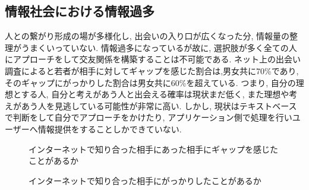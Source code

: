 \subsection{情報社会における情報過多}
人との繋がり形成の場が多様化し, 出会いの入り口が広くなった分, 情報量の整理がうまくいっていない.
情報過多になっているが故に, 選択肢が多く全ての人にアプローチをして交友関係を構築することは不可能である.
ネット上の出会い調査によると若者が相手に対してギャップを感じた割合は,男女共に70\%であり,
そのギャップにがっかりした割合は男女共に60\%を超えている.\cite{mandom}
つまり, 自分の理想とする人, 自分と考えがあう人と出会える確率は現状まだ低く, また理想や考えがあう人を見逃している可能性が非常に高い.
しかし, 現状はテキストベースで判断をして自分でアプローチをかけたり, アプリケーション側で処理を行いユーザーへ情報提供をすることしかできていない.
\begin{figure}[htbp]
    \begin{center}
    \end{center}
    \caption{インターネットで知り合った相手にあった相手にギャップを感じたことがあるか}
    \label{fig:onlinemeeting_to_real}
\end{figure}

\begin{figure}[htbp]
    \begin{center}
    \end{center}
    \caption{インターネットで知り合った相手にがっかりしたことがあるか}
    \label{fig:onlinemeeting_to_real}
\end{figure}

